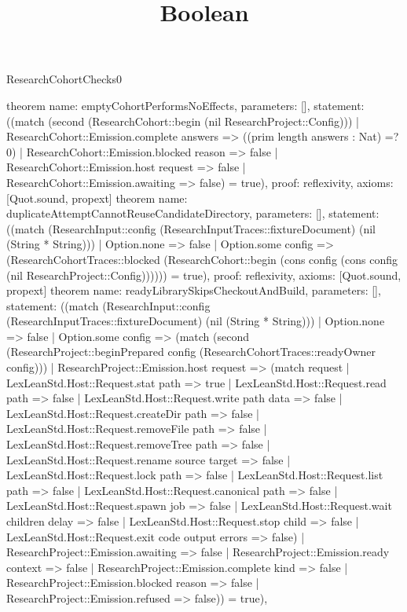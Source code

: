 \begin{lexlean}{ResearchCohortChecks0}
\title{Boolean}
\begin{semanticmodule}
theorem{
 name: emptyCohortPerformsNoEffects,
 parameters: [],
 statement: ((match (second (ResearchCohort::begin (nil ResearchProject::Config))) | ResearchCohort::Emission.complete answers => ((prim length answers : Nat) =? 0) | ResearchCohort::Emission.blocked reason => false | ResearchCohort::Emission.host request => false | ResearchCohort::Emission.awaiting => false) = true),
 proof: reflexivity{},
 axioms: [Quot.sound, propext]
}
theorem{
 name: duplicateAttemptCannotReuseCandidateDirectory,
 parameters: [],
 statement: ((match (ResearchInput::config (ResearchInputTraces::fixtureDocument) (nil (String * String))) | Option.none => false | Option.some config => (ResearchCohortTraces::blocked (ResearchCohort::begin (cons config (cons config (nil ResearchProject::Config)))))) = true),
 proof: reflexivity{},
 axioms: [Quot.sound, propext]
}
theorem{
 name: readyLibrarySkipsCheckoutAndBuild,
 parameters: [],
 statement: ((match (ResearchInput::config (ResearchInputTraces::fixtureDocument) (nil (String * String))) | Option.none => false | Option.some config => (match (second (ResearchProject::beginPrepared config (ResearchCohortTraces::readyOwner config))) | ResearchProject::Emission.host request => (match request | LexLeanStd.Host::Request.stat path => true | LexLeanStd.Host::Request.read path => false | LexLeanStd.Host::Request.write path data => false | LexLeanStd.Host::Request.createDir path => false | LexLeanStd.Host::Request.removeFile path => false | LexLeanStd.Host::Request.removeTree path => false | LexLeanStd.Host::Request.rename source target => false | LexLeanStd.Host::Request.lock path => false | LexLeanStd.Host::Request.list path => false | LexLeanStd.Host::Request.canonical path => false | LexLeanStd.Host::Request.spawn job => false | LexLeanStd.Host::Request.wait children delay => false | LexLeanStd.Host::Request.stop child => false | LexLeanStd.Host::Request.exit code output errors => false) | ResearchProject::Emission.awaiting => false | ResearchProject::Emission.ready context => false | ResearchProject::Emission.complete kind => false | ResearchProject::Emission.blocked reason => false | ResearchProject::Emission.refused => false)) = true),
}
\end{semanticmodule}
\end{lexlean}

